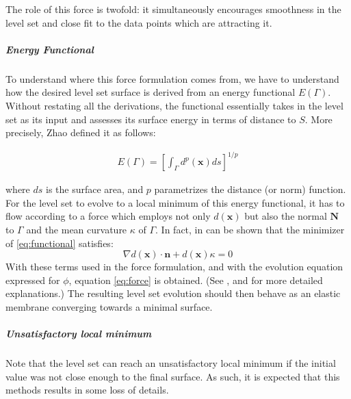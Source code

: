 \documentclass{article}
\begin{document}
The role of this force is twofold: it simultaneously encourages smoothness in
the level set and close fit to the data points which are attracting it.

\subparagraph{Energy Functional}
To understand where this force formulation comes from, we have to understand how
the desired level set surface is derived from an energy functional $E(\Gamma)$.
Without restating all the derivations, the functional essentially takes in the
level set as its input and assesses its surface energy in terms of distance to
$S$. More precisely, Zhao\cite{zhao2000implicit} defined it as follows:

\begin{align}
    \label{eq:functional}
    E(\Gamma) = [\int_\Gamma d^p(\mathbf{x}) ds]^{1/p}
\end{align}

where $ds$ is the surface area, and $p$ parametrizes the distance (or norm)
function. For the level set to evolve to a local minimum of this energy
functional, it has to flow according to a force which employs not only
$d(\mathbf{x})$ but also the normal $\mathbf{N}$ to $\Gamma$ and the mean
curvature $\kappa$ of $\Gamma$. In fact, in can be shown that the minimizer of
\eqref{eq:functional} satisfies:
\[
\nabla d(\mathbf{x}) \cdot \mathbf{n} + d(\mathbf{x}) \kappa = 0
\]
With these terms used in the force formulation, and with the evolution equation
expressed for $\phi$, equation \eqref{eq:force} is obtained. (See \cite{zhao2000implicit},
\cite{zhao2001fast} and \cite{savadjiev2003surface} for more detailed
explanations.) The resulting level set evolution should then behave as an
elastic membrane converging towards a minimal surface.


\subparagraph{Unsatisfactory local minimum}
Note that the level set can reach an unsatisfactory local minimum if the initial
value was not close enough to the final surface. As such, it is expected that
this methods results in some loss of details.
\end{document}
